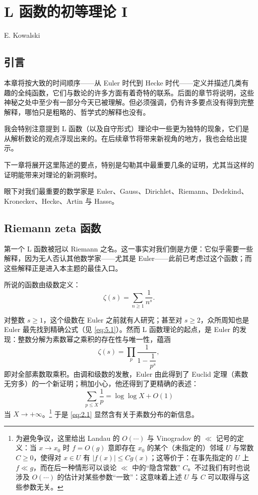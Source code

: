 \chapter{L 函数的初等理论 I}\label{ch:01}

\begin{center}
E. Kowalski
\end{center}

\section{引言}\label{sec:1}

本章将按大致的时间顺序——从 Euler 时代到 Hecke 时代——定义并描述几类有趣的全纯函数，它们与数论的许多方面有着奇特的联系。后面的章节将说明，这些神秘之处中至少有一部分今天已被理解。但必须强调，仍有许多要点没有得到完整解释，哪怕只是粗略的、哲学式的解释也没有。

我会特别注意提到 L 函数（以及自守形式）理论中一些更为独特的现象，它们是从解析数论的观点浮现出来的。在后续章节将带来新视角的地方，我也会给出提示。

下一章将展开这里陈述的要点，特别是勾勒其中最重要几条的证明，尤其当这样的证明能带来对理论的新洞察时。

眼下对我们最重要的数学家是 Euler、Gauss、Dirichlet、Riemann、Dedekind、Kronecker、Hecke、Artin 与 Hasse。

\section{Riemann zeta 函数}\label{sec:2}

第一个 L 函数被冠以 Riemann 之名。这一事实对我们倒是方便：它似乎需要一些解释，因为无人否认其他数学家——尤其是 Euler——此前已考虑过这个函数；而这些解释正是进入本主题的最佳入口。

所说的函数由级数定义：
\[
\zeta(s)=\sum_{n\ge 1}\frac{1}{n^{s}}.
\]

对整数 $s\ge 1$，这个级数在 Euler 之前就有人研究；甚至对 $s\ge 2$，众所周知也是 Euler 最先找到精确公式（见 \eqref{eq:5.1}）。然而 L 函数理论的起点，是 Euler 的发现：整数分解为素数幂之乘积的存在性与唯一性，蕴涵
\begin{equation}\tag{2.1}\label{eq:2.1}
\zeta(s)=\prod_{p}\frac{1}{1-\dfrac{1}{p^{s}}},
\end{equation}
即对全部素数取乘积。由调和级数的发散，Euler 由此得到了 Euclid 定理（素数无穷多）的一个新证明；稍加小心，他还得到了更精确的表述：
\[
\sum_{p\le X}\frac{1}{p}=\log\log X+O(1)
\]
当 $X\to+\infty$。\footnote{为避免争议，这里给出 Landau 的 $O(\cdots)$ 与 Vinogradov 的 $\ll$ 记号的定义：当 $x\to x_0$ 时 $f=O(g)$ 意即存在 $x_0$ 的某个（未指定的）邻域 $U$ 与常数 $C\ge 0$，使得对 $x\in U$ 有 $|f(x)|\le Cg(x)$；这等价于：在事先指定的 $U$ 上 $f\ll g$，而在后一种情形可以谈论 $\ll$ 中的“隐含常数” $C$。不过我们有时也说涉及 $O(\cdots)$ 的估计对某些参数“一致”：这意味着上述 $U$ 与 $C$ 可以取得与这些参数无关。} 于是 \eqref{eq:2.1} 显然含有关于素数分布的新信息。

